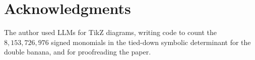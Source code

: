\documentclass[11pt,letterpaper]{amsart}
\theoremstyle{definition}
\begin{document}
\section*{Acknowledgments}

The author used LLMs for TikZ diagrams, writing code to count the $8,153,726,976$ signed monomials in the tied-down symbolic determinant for the double banana, and for proofreading the paper.



\begingroup
\footnotesize

%

\endgroup
\end{document}
